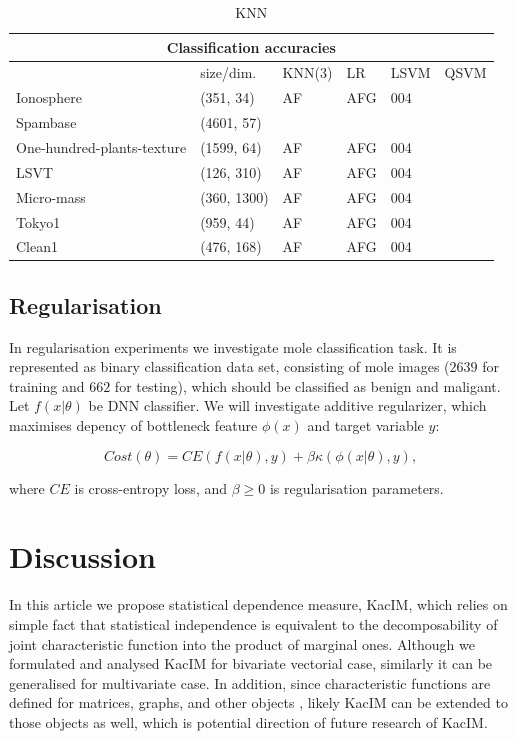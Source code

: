 \documentclass{article}
\begin{document}
\begin{table}	
\label{table:classification_accuracies}	
\centering
\begin{tabular}{ |p{3cm}|p{2.5cm}||p{1.5cm}|p{1cm}|p{1cm}|p{1cm}|  }
	\hline
	\multicolumn{6}{|c|}{Classification accuracies} \\
	\hline
	& size/dim. & KNN(3) & LR & LSVM & QSVM  \\
	\hline
	Ionosphere & (351, 34) & AF    &AFG&   004 & \\	
	\hline
	Spambase & (4601, 57) & & & & \\
	\hline
	One-hundred-plants-texture   & (1599, 64)
	  & AF    &AFG&   004 & \\
	\hline	
	LSVT  & (126, 310) & AF    &AFG&   004 & \\
	\hline
	Micro-mass  & (360, 1300)
	 & AF    &AFG&   004 & \\
	\hline	
	Tokyo1 & (959, 44) & AF    &AFG&   004 & \\
	\hline	
	Clean1 & (476, 168)
	 & AF    &AFG&   004 & \\
	\hline
\end{tabular}
\caption{KNN}
\end{table}

\subsection{Regularisation}
In regularisation experiments we investigate mole classification task. It is represented as binary classification data set, consisting of mole images ($2639$ for training and $662$ for testing), which should be classified as benign and maligant.
Let $f(x|\theta)$ be DNN classifier. We will investigate additive regularizer, which maximises depency of bottleneck feature $\phi(x)$ and target variable $y$: 

\begin{equation}
Cost(\theta) = CE(f(x|\theta),y) + \beta \kappa(\phi(x|\theta),y),
\end{equation}

\noindent where $CE$ is cross-entropy loss, and $\beta \geq 0$ is regularisation parameters.


\section{Discussion} 

\label{section:discussion}
In this article we propose statistical dependence measure, KacIM, which relies on simple fact that statistical independence is equivalent to the decomposability of joint characteristic function  into the product of marginal ones. Although we formulated and analysed KacIM for bivariate vectorial case, similarly it can be generalised for multivariate case. In addition, since characteristic functions are defined for matrices, graphs, and other objects \cite{?}, likely KacIM can be extended to those objects as well, which is potential direction of future research of KacIM.
\end{document}
